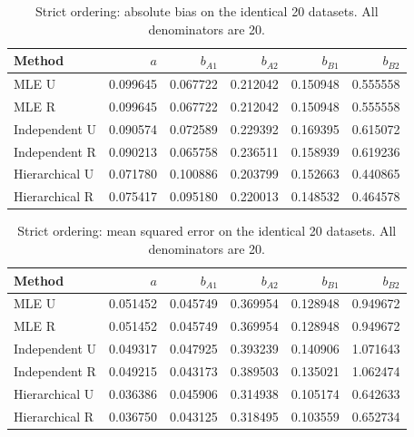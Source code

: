 \begin{table}[htbp]\centering\small

\caption{Strict ordering: absolute bias on the identical 20 datasets. All denominators are 20.}

\begin{tabular}{lrrrrr}\hline Method & $a$ & $b_{A1}$ & $b_{A2}$ & $b_{B1}$ & $b_{B2}$\\\hline

MLE U & 0.099645 & 0.067722 & 0.212042 & 0.150948 & 0.555558\\

MLE R & 0.099645 & 0.067722 & 0.212042 & 0.150948 & 0.555558\\

Independent U & 0.090574 & 0.072589 & 0.229392 & 0.169395 & 0.615072\\

Independent R & 0.090213 & 0.065758 & 0.236511 & 0.158939 & 0.619236\\

Hierarchical U & 0.071780 & 0.100886 & 0.203799 & 0.152663 & 0.440865\\

Hierarchical R & 0.075417 & 0.095180 & 0.220013 & 0.148532 & 0.464578\\

\hline\end{tabular}\end{table}

\begin{table}[htbp]\centering\small

\caption{Strict ordering: mean squared error on the identical 20 datasets. All denominators are 20.}

\begin{tabular}{lrrrrr}\hline Method & $a$ & $b_{A1}$ & $b_{A2}$ & $b_{B1}$ & $b_{B2}$\\\hline

MLE U & 0.051452 & 0.045749 & 0.369954 & 0.128948 & 0.949672\\

MLE R & 0.051452 & 0.045749 & 0.369954 & 0.128948 & 0.949672\\

Independent U & 0.049317 & 0.047925 & 0.393239 & 0.140906 & 1.071643\\

Independent R & 0.049215 & 0.043173 & 0.389503 & 0.135021 & 1.062474\\

Hierarchical U & 0.036386 & 0.045906 & 0.314938 & 0.105174 & 0.642633\\

Hierarchical R & 0.036750 & 0.043125 & 0.318495 & 0.103559 & 0.652734\\

\hline\end{tabular}\end{table}

